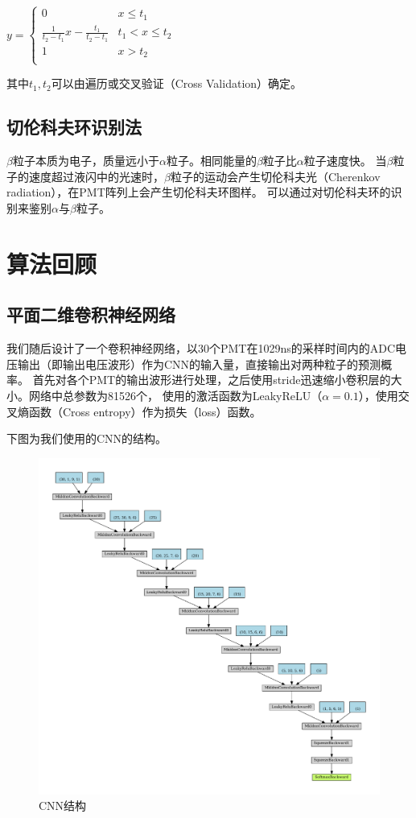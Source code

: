\documentclass{ctexart}
\begin{document}
$y = \begin{cases}
    0 & x \leq t_{1} \\
    \frac{1}{t_{2}-t_{1}}x-\frac{t_{1}}{t_{2}-t_{1}} & t_{1} < x \leq t_{2} \\
    1 & x > t_{2} \\
\end{cases}$

其中$t_{1},t_{2}$可以由遍历或交叉验证（Cross Validation）确定。

\subsection{切伦科夫环识别法}
$\beta$粒子本质为电子，质量远小于$\alpha$粒子。相同能量的$\beta$粒子比$\alpha$粒子速度快。
当$\beta$粒子的速度超过液闪中的光速时，$\beta$粒子的运动会产生切伦科夫光（Cherenkov radiation），在PMT阵列上会产生切伦科夫环图样。
可以通过对切伦科夫环的识别来鉴别$\alpha$与$\beta$粒子。

\section{算法回顾}
\subsection{平面二维卷积神经网络} %
\label{sub:平面二维卷积神经网络}
我们随后设计了一个卷积神经网络，以30个PMT在1029ns的采样时间内的ADC电压输出（即输出电压波形）作为CNN的输入量，直接输出对两种粒子的预测概率。
首先对各个PMT的输出波形进行处理，之后使用stride迅速缩小卷积层的大小。网络中总参数为81526个，
使用的激活函数为LeakyReLU（$\alpha=0.1$），使用交叉熵函数（Cross entropy）作为损失（loss）函数。


下图为我们使用的CNN的结构。

\begin{figure}[H]
    \centering
    \includegraphics[width=1.0\linewidth]{net.pdf}
    \caption{CNN结构}
\end{figure}
\end{document}
